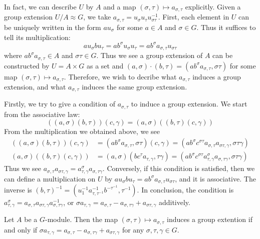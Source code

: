 \begin{analysis}
    In fact, we can describe $U$ by $A$ and a map $(\sigma,\tau)\mapsto a_{\sigma,\tau}$ explicitly. Given a group extension $U/A\approx G$, we take $a_{\sigma,\tau}=u_\sigma u_\tau u_{\sigma\tau}^{-1}$. First, each element in $U$ can be uniquely written in the form $au_\sigma$ for some $a\in A$ and $\sigma\in G$. Thus it suffices to tell its multiplication: $$ au_\sigma bu_\tau=ab^\sigma u_\sigma u_\tau=ab^\sigma a_{\sigma,\tau}u_{\sigma\tau} $$ where $ab^\sigma a_{\sigma,\tau}\in A$ and $\sigma\tau\in G$. Thus we see a group extension of $A$ can be constructed by $U=A\times G$ as a set and $(a,\sigma)\cdot(b,\tau)=(ab^\sigma a_{\sigma,\tau},\sigma\tau)$ for some map $(\sigma,\tau)\mapsto a_{\sigma,\tau}$. Therefore, we wish to decribe what $a_{\sigma,\tau}$ induces a group extension, and what $a_{\sigma,\tau}$ induces the same group extension.

    Firstly, we try to give a condition of $a_{\sigma,\tau}$ to induce a group extension. We start from the associative law: $$ ((a,\sigma)(b,\tau))(c,\gamma)=(a,\sigma)((b,\tau)(c,\gamma)) $$ From the multiplication we obtained above, we see \begin{align*} ((a,\sigma)(b,\tau))(c,\gamma)&=(ab^\sigma a_{\sigma,\tau},\sigma\tau)(c,\gamma)=(ab^\sigma c^{\sigma\tau}a_{\sigma,\tau}a_{\sigma\tau,\gamma},\sigma\tau\gamma) \\ (a,\sigma)((b,\tau)(c,\gamma))&=(a,\sigma)(bc^\tau a_{\tau,\gamma},\tau\gamma)=(ab^\sigma c^{\sigma\tau}a_{\tau,\gamma}^\sigma a_{\sigma,\tau\gamma},\sigma\tau\gamma) \end{align*} Thus we see $a_{\sigma,\tau}a_{\sigma\tau,\gamma}=a_{\tau,\gamma}^\sigma a_{\sigma,\tau\gamma}$. Conversely, if this condition is satisfied, then we can define a multiplication on $U$ by $au_\sigma bu_\tau=ab^\sigma a_{\sigma,\tau}u_{\sigma\tau}$, and it is associative. The inverse is $(b,\tau)^{-1}=(u_1^{-1}a_{\tau,\tau^{-1}}^{-1}b^{-\tau^{-1}},\tau^{-1})$. In conclusion, the condition is $a_{\tau,\gamma}^\sigma=a_{\sigma,\tau}a_{\sigma\tau,\gamma}a_{\sigma,\tau\gamma}^{-1}$, or $\sigma a_{\tau,\gamma}=a_{\sigma,\tau}-a_{\sigma,\tau\gamma}+a_{\sigma\tau,\gamma}$ additively.
\end{analysis}

\begin{proposition}
    Let $A$ be a $G$-module. Then the map $(\sigma,\tau)\mapsto a_{\sigma,\tau}$ induces a group extention if and only if $\sigma a_{\tau,\gamma}=a_{\sigma,\tau}-a_{\sigma,\tau\gamma}+a_{\sigma\tau,\gamma}$ for any $\sigma,\tau,\gamma\in G$.
\end{proposition}


